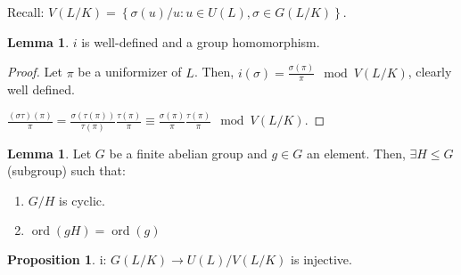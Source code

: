 \documentclass{article}
\theoremstyle{definition}
\numberwithin{theorem}{subsection}
\newtheorem{proposition}[theorem]{Proposition}
\newtheorem{lemma}[theorem]{Lemma}
\begin{document}
    Recall: \(V(L / K)= \left\{ \sigma(u) / u : u \in U(L), \sigma \in G(L / K) \right\} \).

    \begin{lemma}
        \(i\) is well-defined and a group homomorphism.
    \end{lemma}

    \begin{proof}
        Let \(\pi\) be a uniformizer of \(L\). Then, \(i(\sigma) = \frac{\sigma(\pi)}{\pi} \mod V(L / K)\), clearly well defined.
    
        \(\frac{(\sigma \tau)(\pi)}{\pi} = \frac{\sigma(\tau(\pi))}{\tau(\pi)} \frac{\tau(\pi)}{\pi} \equiv \frac{\sigma(\pi)}{\pi} \frac{\tau(\pi)}{\pi} \mod V(L / K)\).
    \end{proof}

    \begin{lemma}
        Let \(G\) be a finite abelian group and \(g\in G\) an element. Then, \(\exists H \leq G\) (subgroup) such that:

        \begin{enumerate}[label=\roman*)]
            \item \(G / H\) is cyclic.
            \item \(\operatorname{ord} (gH) = \operatorname{ord} (g)\)  
        \end{enumerate} 
    \end{lemma}

    \begin{proposition}
        i: \(G(L / K) \to U(L) / V(L / K)\) is injective.
    \end{proposition}
    
\end{document}
